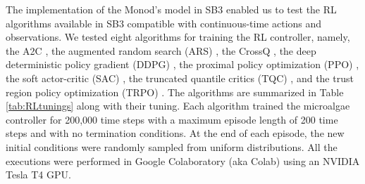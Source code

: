 \documentclass[lettersize,journal]{IEEEtran}
\begin{document}
The implementation of the Monod's model in SB3 enabled us to test the RL algorithms available in SB3 compatible with continuous-time actions and observations. We tested eight algorithms for training the RL controller, namely, the A2C \cite{mnih2016asynchronous}, the augmented random search (ARS) \cite{NEURIPS2018_7634ea65}, the CrossQ \cite{bhattcrossq}, the deep deterministic policy gradient (DDPG) \cite{lillicrap2019continuouscontroldeepreinforcement}, the proximal policy optimization (PPO) \cite{schulman2017proximal},  the soft actor-critic (SAC) \cite{haarnoja2018soft}, the truncated quantile critics (TQC) \cite{kuznetsov2020controlling}, and the trust region policy optimization (TRPO) \cite{pmlr-v37-schulman15}. The algorithms are summarized in Table \ref{tab:RLtunings} along with their tuning. Each algorithm trained the microalgae controller for 200,000 time steps with a maximum episode length of 200 time steps and with no termination conditions. At the end of each episode, the new initial conditions were randomly sampled from uniform distributions. All the executions were performed in Google Colaboratory (aka Colab) using an NVIDIA Tesla T4 GPU. 
\end{document}
